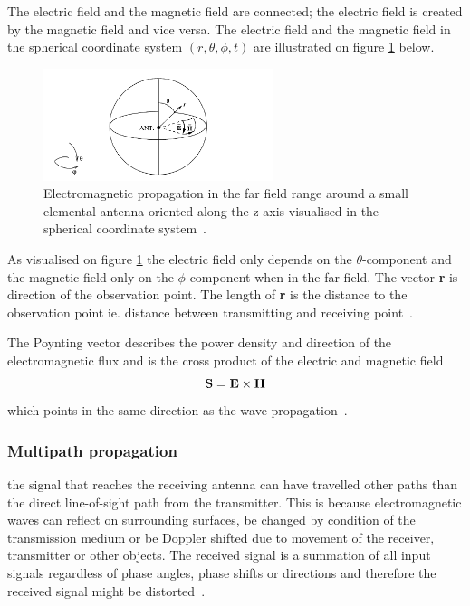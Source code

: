 The electric field and the magnetic field are connected; the electric field is created by the magnetic field and vice versa. The electric field and the magnetic field in the spherical coordinate system $\left(r, \theta, \phi, t\right)$ are illustrated on figure \ref{fig:em_field} below.
\begin{figure}[H]
    \centering
    \includegraphics[width=0.6\textwidth]{figures/em_polar_coordinates.png}
    \caption{Electromagnetic propagation in the far field range around a small elemental antenna oriented along the z-axis visualised in the spherical coordinate system~\cite[p. 58]{maxwell_theory}.} \label{fig:em_field}
\end{figure}

As visualised on figure \ref{fig:em_field} the electric field only depends on the $\theta$-component and the magnetic field only on the $\phi$-component when in the far field. The vector \textbf{r} is direction of the observation point. The length of \textbf{r} is the distance to the observation point ie. distance between transmitting and receiving point~\cite[p. 59]{maxwell_theory}.

The Poynting vector describes the power density and direction of the electromagnetic flux and is the cross product of the electric and magnetic field 
\begin{equation}
    \textbf{S} = \textbf{E} \times \textbf{H}
    \tagaddtext{[\si{\watt\per\meter\squared}]}
\end{equation}
which points in the same direction as the wave propagation~\cite[p. 3]{ant_beam_form}. 

\subsubsection{Multipath propagation}
the signal that reaches the receiving antenna can have travelled other paths than the direct line-of-sight path from the transmitter. This is because electromagnetic waves can reflect on surrounding surfaces, be changed by condition of the transmission medium or be Doppler shifted due to movement of the receiver, transmitter or other objects. The received signal is a summation of all input signals regardless of phase angles, phase shifts or directions and therefore the received signal might be distorted~\cite[pp. 1-2]{itu_multipath}. 

